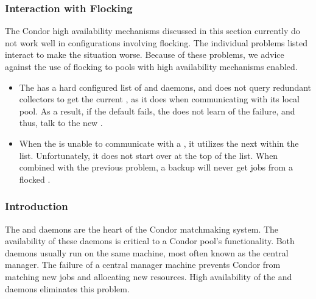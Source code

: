 \subsubsection{\label{sec:HA-not-with-flocking} Interaction with Flocking} 

The Condor high availability mechanisms discussed in this section
currently do not work well in configurations involving flocking.
The individual problems listed interact to make the situation
worse.
Because of these problems, we advice against the use of
flocking to pools with high availability mechanisms enabled.

\begin{itemize}
\item The  has a hard configured list of
 and  daemons, 
and does not query
redundant collectors to get the current , 
as it does when communicating with its local pool.
As a result, if the
default  fails, the  does not learn
of the failure,
and thus, talk to the new .

\item When the  is unable to communicate with a
, it utilizes the next 
within the list.
Unfortunately, it does not start over at the top of the list.
When combined with the previous problem,
a backup  will never get
jobs from a flocked .

\end{itemize}

\subsubsection{\label{sec:HA-of-CM-intro} Introduction} 

The  and  daemons
are the heart of the Condor matchmaking system.
The availability of these daemons is critical to a Condor pool's
functionality.
Both daemons usually run on the same machine,
most often known as the central manager.
The failure of a central manager machine prevents Condor from matching
new jobs and allocating new resources.
High availability of the  and  daemons
eliminates this problem. 

